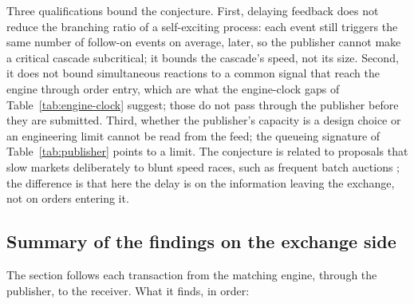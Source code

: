 \documentclass[11pt]{article}
\begin{document}
Three qualifications bound the conjecture. First, delaying feedback does not reduce the
branching ratio of a self-exciting process: each event still triggers the same number of
follow-on events on average, later, so the publisher cannot make a critical cascade
subcritical; it bounds the cascade's speed, not its size. Second, it does not bound
simultaneous reactions to a common signal that reach the engine through order entry, which
are what the engine-clock gaps of Table~\ref{tab:engine-clock} suggest; those do not pass
through the publisher before they are submitted. Third, whether the publisher's capacity
is a design choice or an engineering limit cannot be read from the feed; the queueing
signature of Table~\ref{tab:publisher} points to a limit. The conjecture is related to
proposals that slow markets deliberately to blunt speed races, such as frequent batch
auctions \citep{budish2015fba}; the difference is that here the delay is on the
information leaving the exchange, not on orders entering it.

\subsection{Summary of the findings on the exchange side}
\label{sec:exchange-summary}

The section follows each transaction from the matching engine, through the publisher, to
the receiver. What it finds, in order:
\end{document}
